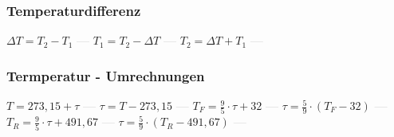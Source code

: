 \subsubsection{Temperaturdifferenz} 
\begin{minipage}{0.45\textwidth} 
\end{minipage} 
\begin{minipage}{0.45\textwidth} 
 
\end{minipage} 
$ \Delta T = T_{2}  - T_{1} $ \textcolor{lightgray}{\textbf{---}} 
$ T_{1}  = T_{2}  - \Delta T $ \textcolor{lightgray}{\textbf{---}} 
$ T_{2}  = \Delta T + T_{1} $ \textcolor{lightgray}{\textbf{---}} 

\subsubsection{Termperatur - Umrechnungen} 
\begin{minipage}{0.45\textwidth} 
\end{minipage} 
\begin{minipage}{0.45\textwidth} 
 
\end{minipage} 
$ T = 273,15 + \tau $ \textcolor{lightgray}{\textbf{---}} 
$ \tau  = T-273,15 $ \textcolor{lightgray}{\textbf{---}} 
$ T_{F}  = \frac{9}{5}\cdot \tau  +32 $ \textcolor{lightgray}{\textbf{---}} 
$ \tau  = \frac{5}{9}\cdot (T_{F}  - 32) $ \textcolor{lightgray}{\textbf{---}} 
$ T_{R}  = \frac{9}{5}\cdot \tau  + 491,67 $ \textcolor{lightgray}{\textbf{---}} 
$ \tau  = \frac{5}{9}\cdot (T_{R}  - 491,67) $ \textcolor{lightgray}{\textbf{---}} 

